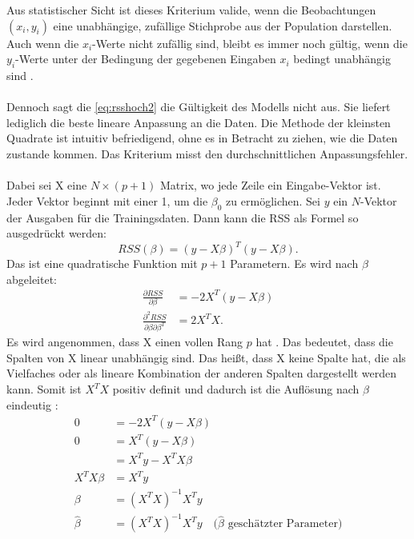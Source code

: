 Aus statistischer Sicht ist dieses Kriterium valide, wenn die Beobachtungen \( (x_i, y_i) \) eine unabhängige, zufällige Stichprobe aus der Population darstellen. Auch wenn die \(x_i\)-Werte nicht zufällig sind, bleibt es immer noch gültig, wenn die \(y_i\)-Werte unter der Bedingung der gegebenen Eingaben \(x_i\) bedingt unabhängig sind \cite{hastie2009elements}.  \\\\
Dennoch sagt die \autoref{eq:rsshoch2} die Gültigkeit des Modells nicht aus. Sie liefert lediglich die beste lineare Anpassung an die Daten. Die Methode der kleinsten Quadrate ist intuitiv befriedigend, ohne es in Betracht zu ziehen, wie die Daten zustande kommen. Das Kriterium misst den durchschnittlichen Anpassungsfehler. \\\\
Dabei sei X eine \( N \times (p + 1) \) Matrix, wo jede Zeile ein Eingabe-Vektor ist. Jeder Vektor beginnt mit einer 1, um die $\beta_0$ zu ermöglichen. Sei \(y\) ein \(N\)-Vektor der Ausgaben für die Trainingsdaten. Dann kann die \ac{RSS} als Formel so ausgedrückt werden: 
\begin{equation}
RSS(\beta) = (y - X\beta)^T (y - X\beta).
\label{eq:RSSmatrix}
\end{equation}
Das ist eine quadratische Funktion mit \(p + 1\) Parametern. Es wird nach $\beta$ abgeleitet:
\begin{equation}
\begin{aligned}
\frac{\partial RSS}{\partial \beta} &= -2 X^T (y - X\beta) \\
\frac{\partial^2 RSS}{\partial \beta \partial \beta^T} &= 2 X^T X.
\end{aligned}
\label{eq:RSSableitung}
\end{equation}
Es wird angenommen, dass X einen vollen Rang \(p\) hat \cite{huber1981robust}. Das bedeutet, dass die Spalten von X linear unabhängig sind. Das heißt, dass X keine Spalte hat, die als Vielfaches oder als lineare Kombination der anderen Spalten dargestellt werden kann.  Somit ist \( X^T X \) positiv definit und dadurch ist die Auflösung nach $\beta$ eindeutig \cite{hastie2009elements}: 
\begin{equation}
\begin{aligned}
0 &= -2 X^T (y - X\beta) \quad  \\
0 &= X^T (y - X\beta) \quad  \\
  &= X^T y - X^T X \beta \\
X^T X \beta &= X^T y \\
\beta &= (X^T X)^{-1} X^T y \\
\hat{\beta} &= (X^T X)^{-1} X^T y \quad \text{($\hat{\beta}$ geschätzter Parameter)}
\end{aligned}
\label{XTXderived}
\end{equation}
